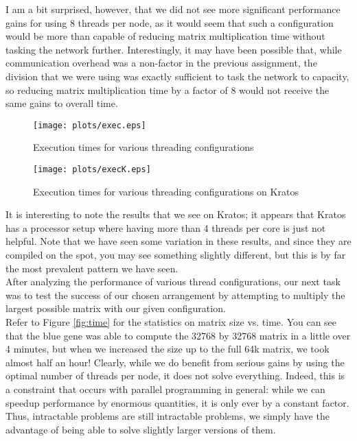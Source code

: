 \documentclass[twocolumn]{article}
\begin{document}
I am a bit surprised, however, that we did not see 
more significant performance gains for using 8 threads per node, as it would seem 
that such a configuration would be more than capable of reducing matrix 
multiplication time without tasking the network further. Interestingly, it may
have been possible that, while communication overhead was a non-factor in the 
previous assignment, the division that we were using was exactly sufficient to
task the network to capacity, so reducing matrix multiplication time by a factor
of 8 would not receive the same gains to overall time. \\

\begin{figure}
  \centering
  \texttt{[image: plots/exec.eps]}
  \caption{Execution times for various threading configurations} \label{fig:exec}
\end{figure}

\begin{figure}
  \centering
  \texttt{[image: plots/execK.eps]}
  \caption{Execution times for various threading configurations on Kratos} 
\end{figure}

It is interesting to note the results that we see on Kratos; it appears that Kratos
has a processor setup where having more than 4 threads per
core is just not helpful. Note that we have seen some variation in these results,
and since they are compiled on the spot, you may see something slightly different,
but this is by far the most prevalent pattern we have seen.\\

After analyzing the performance of various thread configurations, our next task
was to test the success of our chosen arrangement by attempting to multiply the
largest possible matrix with our given configuration. \\

Refer to Figure \ref{fig:time} for the statistics on matrix size vs. time. You can
see that the blue gene was able to compute the 32768 by 32768 matrix in a little 
over 4 minutes, but when we increased the size up to the full 64k matrix, we took
almost half an hour! Clearly, while we do benefit from serious gains by using the
optimal number of threads per node, it does not solve everything. Indeed, this is
a constraint that occurs with parallel programming in general: while we can speedup
performance by enormous quantities, it is only ever by a constant factor. Thus, 
intractable problems are still intractable problems, we simply have the advantage of
being able to solve slightly larger versions of them. \\
\end{document}
